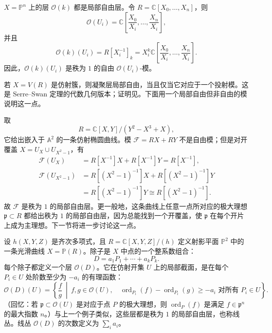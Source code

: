 \begin{example}[射影空间上的可逆层]
$X=\mathbb P^n$ 上的层 $\mathcal O(k)$ 都是局部自由层。令 $R=\mathbb C[X_0,\ldots,X_n]$，则
\[
  \mathcal O(U_i)=\mathbb C\left[\frac{X_0}{X_i},\ldots,\frac{X_n}{X_i}\right],
\]
并且
\[
  \mathcal O(k)(U_i)=R[X_i^{-1}]_k
  =X_i^k\mathbb C\left[\frac{X_0}{X_i},\ldots,\frac{X_n}{X_i}\right].
\]
因此，$\mathcal O(k)(U_i)$ 是秩为 $1$ 的自由 $\mathcal O(U_i)$-模。
\end{example}

\begin{example}[局部自由但非自由的模]
若 $X=V(R)$ 是仿射簇，则凝聚层局部自由，当且仅当它对应于一个投射模。这是 Serre--Swan 定理的代数几何版本；证明见。下面用一个局部自由但非自由的模说明这一点。

取
\[
  R=\mathbb C[X,Y]/(Y^2-X^3+X),
\]
它给出嵌入于 $\mathbb A^2$ 的一条仿射椭圆曲线。模 $\mathcal F=RX+RY$ 不是自由模；但是对开覆盖 $X=U_X\cup U_{X^2-1}$，有
\[
\begin{aligned}
  \mathcal F(U_X)
    &=R[X^{-1}]X+R[X^{-1}]Y=R[X^{-1}],\\
  \mathcal F(U_{X^2-1})
    &=R[(X^2-1)^{-1}]X+R[(X^2-1)^{-1}]Y\\
    &=R[(X^2-1)^{-1}]Y\cong R[(X^2-1)^{-1}].
\end{aligned}
\]
故 $\mathcal F$ 是秩为 $1$ 的局部自由层。更一般地，这条曲线上任意一点所对应的极大理想 $\mathfrak p\subset R$ 都给出秩为 $1$ 的局部自由层，因为总能找到一个开覆盖，使 $\mathfrak p$ 在每个开片上成为主理想。下一节将进一步讨论这一点。
\end{example}

\begin{example}[除子所确定的层]\label{ex:divisor-sheaf}
设 $h(X,Y,Z)$ 是齐次多项式，且 $R=\mathbb C[X,Y,Z]/(h)$ 定义射影平面 $\mathbb P^2$ 中的一条光滑曲线 $X=\mathbb P(R)$。除子是 $X$ 中点的一个整系数组合：
\[
  D=a_1P_1+\cdots+a_kP_k.
\]
每个除子都定义一个层 $\mathcal O(D)$。它在仿射开集 $U$ 上的局部截面，是在每个 $P_i\in U$ 处阶数至少为 $-a_i$ 的有理函数：
\[
  \mathcal O(D)(U)=\left\{\frac fg\ \middle|\ f,g\in\mathcal O(U),\quad
  \operatorname{ord}_{P_i}(f)-\operatorname{ord}_{P_i}(g)\ge -a_i\text{ 对所有 }P_i\in U\right\}.
\]
（回忆：若 $\mathfrak p\subset\mathcal O(U)$ 是对应于点 $P$ 的极大理想，则 $\operatorname{ord}_{P}(f)$ 是满足 $f\in\mathfrak p^n$ 的最大指数 $n$。）与上一个例子类似，这些层都是秩为 $1$ 的局部自由层，也称线丛。线丛 $\mathcal O(D)$ 的次数定义为 $\sum_i a_i$。
\end{example}

